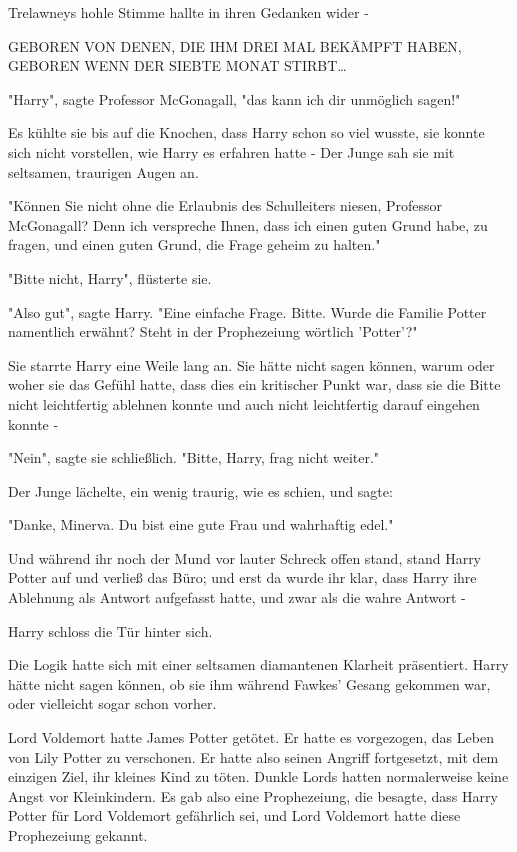 {Trelawneys hohle Stimme hallte in ihren Gedanken wider -

GEBOREN VON DENEN, DIE IHM DREI MAL BEKÄMPFT HABEN, GEBOREN WENN DER SIEBTE MONAT STIRBT…

"Harry", sagte Professor McGonagall, "das kann ich dir unmöglich sagen!"

Es kühlte sie bis auf die Knochen, dass Harry schon so viel wusste, sie konnte sich nicht vorstellen, wie Harry es erfahren hatte - Der Junge sah sie mit seltsamen, traurigen Augen an.

"Können Sie nicht ohne die Erlaubnis des Schulleiters niesen, Professor McGonagall? Denn ich verspreche Ihnen, dass ich einen guten Grund habe, zu fragen, und einen guten Grund, die Frage geheim zu halten."

"Bitte nicht, Harry", flüsterte sie.

"Also gut", sagte Harry. "Eine einfache Frage. Bitte. Wurde die Familie Potter namentlich erwähnt? Steht in der Prophezeiung wörtlich 'Potter'?"

Sie starrte Harry eine Weile lang an. Sie hätte nicht sagen können, warum oder woher sie das Gefühl hatte, dass dies ein kritischer Punkt war, dass sie die Bitte nicht leichtfertig ablehnen konnte und auch nicht leichtfertig darauf eingehen konnte -

"Nein", sagte sie schließlich. "Bitte, Harry, frag nicht weiter."

Der Junge lächelte, ein wenig traurig, wie es schien, und sagte:

"Danke, Minerva. Du bist eine gute Frau und wahrhaftig edel."

Und während ihr noch der Mund vor lauter Schreck offen stand, stand Harry Potter auf und verließ das Büro; und erst da wurde ihr klar, dass Harry ihre Ablehnung als Antwort aufgefasst hatte, und zwar als die wahre Antwort -

Harry schloss die Tür hinter sich.

Die Logik hatte sich mit einer seltsamen diamantenen Klarheit präsentiert. Harry hätte nicht sagen können, ob sie ihm während Fawkes' Gesang gekommen war, oder vielleicht sogar schon vorher.

Lord Voldemort hatte James Potter getötet. Er hatte es vorgezogen, das Leben von Lily Potter zu verschonen. Er hatte also seinen Angriff fortgesetzt, mit dem einzigen Ziel, ihr kleines Kind zu töten. Dunkle Lords hatten normalerweise keine Angst vor Kleinkindern. Es gab also eine Prophezeiung, die besagte, dass Harry Potter für Lord Voldemort gefährlich sei, und Lord Voldemort hatte diese Prophezeiung gekannt.

}
